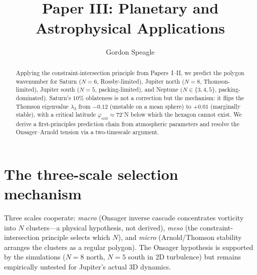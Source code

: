 





\title{\seriestitle\\[6pt]\large Paper III: Planetary and Astrophysical Applications}
\author{Gordon Speagle}
\date{}


\maketitle

\begin{abstract}
Applying the constraint-intersection principle from Papers~I--II, we predict the polygon wavenumber for Saturn ($N=6$, Rossby-limited), Jupiter north ($N=8$, Thomson-limited), Jupiter south ($N=5$, packing-limited), and Neptune ($N \in \{3,4,5\}$, packing-dominated). Saturn's $10\%$ oblateness is not a correction but the mechanism: it flips the Thomson eigenvalue $\lambda_3$ from $-0.12$ (unstable on a mean sphere) to $+0.01$ (marginally stable), with a critical latitude $\varphi_{\mathrm{crit}} \approx 72^\circ$N below which the hexagon cannot exist. We derive a first-principles prediction chain from atmospheric parameters and resolve the Onsager--Arnold tension via a two-timescale argument.
\end{abstract}

\label{part:planets}

\section{The three-scale selection mechanism}
\label{sec:three-scale}
\label{sec:two-scale}
\label{sec:extensions}

Three scales cooperate:
\emph{macro} (Onsager inverse cascade concentrates vorticity into
$N$ clusters---a physical hypothesis, not derived),
\emph{meso} (the constraint-intersection principle selects which $N$),
and \emph{micro} (Arnold/Thomson stability arranges the clusters as
a regular polygon).
The Onsager hypothesis is supported by the \citet{Siegelman2022}
simulations ($N = 8$ north, $N = 5$ south in 2D turbulence)
but remains empirically untested for Jupiter's actual 3D dynamics.


